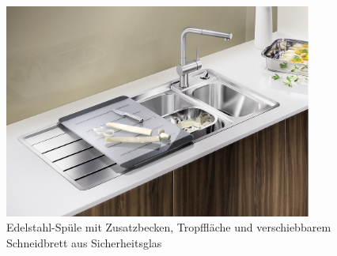 \begin{figure}[ht]
	\centering
  \includegraphics[width=0.9\textwidth]{Spuelbecken2.jpg}
	\caption{
Edelstahl-Spüle mit Zusatzbecken, Tropffläche und verschiebbarem Schneidbrett aus Sicherheitsglas}
	\label{fig1}
\end{figure}

